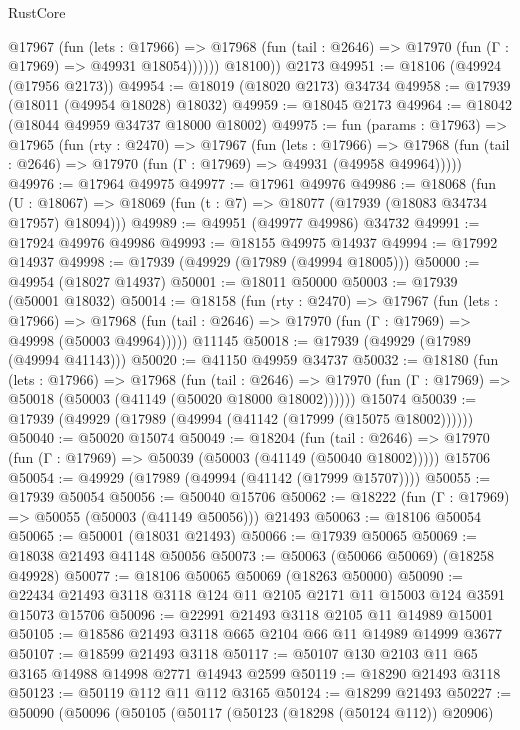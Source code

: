 \begin{lexlean}{RustCore}
\begin{coremodule}
            @17967
              (fun (lets : @17966) =>
              @17968 (fun (tail : @2646) => @17970 (fun (Γ : @17969) => @49931 @18054))))))
        @18100))
    @2173
@49951 := @18106 (@49924 (@17956 @2173))
@49954 := @18019 (@18020 @2173) @34734
@49958 := @17939 (@18011 (@49954 @18028) @18032)
@49959 := @18045 @2173
@49964 := @18042 (@18044 @49959 @34737 @18000 @18002)
@49975 := fun (params : @17963) =>
  @17965
    (fun (rty : @2470) =>
    @17967
      (fun (lets : @17966) =>
      @17968 (fun (tail : @2646) => @17970 (fun (Γ : @17969) => @49931 (@49958 @49964)))))
@49976 := @17964 @49975
@49977 := @17961 @49976
@49986 := @18068
    (fun (U : @18067) => @18069 (fun (t : @7) => @18077 (@17939 (@18083 @34734 @17957) @18094)))
@49989 := @49951 (@49977 @49986) @34732
@49991 := @17924 @49976 @49986
@49993 := @18155 @49975 @14937
@49994 := @17992 @14937
@49998 := @17939 (@49929 (@17989 (@49994 @18005)))
@50000 := @49954 (@18027 @14937)
@50001 := @18011 @50000
@50003 := @17939 (@50001 @18032)
@50014 := @18158
    (fun (rty : @2470) =>
    @17967
      (fun (lets : @17966) =>
      @17968 (fun (tail : @2646) => @17970 (fun (Γ : @17969) => @49998 (@50003 @49964)))))
    @11145
@50018 := @17939 (@49929 (@17989 (@49994 @41143)))
@50020 := @41150 @49959 @34737
@50032 := @18180
    (fun (lets : @17966) =>
    @17968
      (fun (tail : @2646) =>
      @17970 (fun (Γ : @17969) => @50018 (@50003 (@41149 (@50020 @18000 @18002))))))
    @15074
@50039 := @17939 (@49929 (@17989 (@49994 (@41142 (@17999 (@15075 @18002))))))
@50040 := @50020 @15074
@50049 := @18204
    (fun (tail : @2646) => @17970 (fun (Γ : @17969) => @50039 (@50003 (@41149 (@50040 @18002)))))
    @15706
@50054 := @49929 (@17989 (@49994 (@41142 (@17999 @15707))))
@50055 := @17939 @50054
@50056 := @50040 @15706
@50062 := @18222 (fun (Γ : @17969) => @50055 (@50003 (@41149 @50056))) @21493
@50063 := @18106 @50054
@50065 := @50001 (@18031 @21493)
@50066 := @17939 @50065
@50069 := @18038 @21493 @41148 @50056
@50073 := @50063 (@50066 @50069) (@18258 @49928)
@50077 := @18106 @50065 @50069 (@18263 @50000)
@50090 := @22434 @21493 @3118 @3118 @124 @11 @2105 @2171 @11 @15003 @124 @3591 @15073 @15706
@50096 := @22991 @21493 @3118 @2105 @11 @14989 @15001
@50105 := @18586 @21493 @3118 @665 @2104 @66 @11 @14989 @14999 @3677
@50107 := @18599 @21493 @3118
@50117 := @50107 @130 @2103 @11 @65 @3165 @14988 @14998 @2771 @14943 @2599
@50119 := @18290 @21493 @3118
@50123 := @50119 @112 @11 @112 @3165
@50124 := @18299 @21493
@50227 := @50090
    (@50096
      (@50105
        (@50117
          (@50123 (@18298 (@50124 @112)) @20906)

\end{coremodule}
\end{lexlean}
